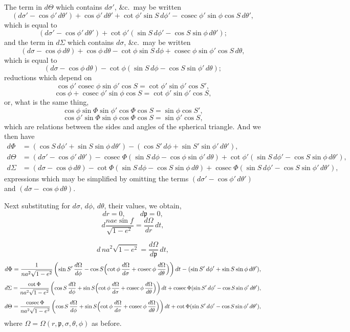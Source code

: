\documentclass[11pt]{article}
\begin{document}
\medskip
\noindent The term in $d\Theta$ which contains $d\sigma'$, \&c.\ may be written
\[
(d\sigma' - \cos\phi'\,d\theta') + \cos\phi'\,d\theta' + \cot\phi'\sin S\,d\phi' - \operatorname{cosec}\phi'\sin\phi\cos S\,d\theta',
\]
which is equal to
\[
(d\sigma' - \cos\phi'\,d\theta') + \cot\phi'(\sin S\,d\phi' - \cos S\sin\phi\,d\theta');
\]
and the term in $d\Sigma$ which contains $d\sigma$, \&c.\ may be written
\[
(d\sigma - \cos\phi\,d\theta) + \cos\phi\,d\theta - \cot\phi\sin S\,d\phi + \operatorname{cosec}\phi\sin\phi'\cos S\,d\theta,
\]
which is equal to
\[
(d\sigma - \cos\phi\,d\theta) - \cot\phi(\sin S\,d\phi - \cos S\sin\phi'\,d\theta);
\]
reductions which depend on
\[
\cos\phi'\operatorname{cosec}\phi\sin\phi'\cos S = \cot\phi'\sin\phi'\cos S',
\]
\[
\cos\phi + \operatorname{cosec}\phi'\sin\phi\cos S = \cot\phi'\sin\phi'\cos S,
\]
or, what is the same thing,
\[
\cos\phi\sin\Phi\sin\phi'\cos\Phi\cos S = \sin\phi\cos S',
\]
\[
\cos\phi'\sin\Phi\sin\phi\cos\Phi\cos S = \sin\phi'\cos S,
\]
which are relations between the sides and angles of the spherical triangle. And we then have
\begin{align*}
d\Phi &= (\cos S\,d\phi' + \sin S\sin\phi\,d\theta') - (\cos S'\,d\phi + \sin S'\sin\phi'\,d\theta'), \\
d\Theta &= (d\sigma' - \cos\phi'\,d\theta') - \operatorname{cosec}\Phi(\sin S\,d\phi - \cos\phi\sin\phi'\,d\theta) + \cot\phi'(\sin S\,d\phi' - \cos S\sin\phi\,d\theta'), \\
d\Sigma &= (d\sigma - \cos\phi\,d\theta) - \cot\Phi(\sin S\,d\phi - \cos S\sin\phi\,d\theta) + \operatorname{cosec}\Phi(\sin S\,d\phi' - \cos S\sin\phi'\,d\theta'),
\end{align*}
expressions which may be simplified by omitting the terms $(d\sigma' - \cos\phi'\,d\theta')$ and $(d\sigma - \cos\phi\,d\theta)$.

\medskip
\noindent Next substituting for $d\sigma$, $d\phi$, $d\theta$, their values, we obtain,
\[
dr = 0,\qquad d\mathfrak{p}=0,
\]
\[
d\frac{nae\sin f}{\sqrt{1-e^{2}}} = \frac{d\Omega}{dr}\,dt,
\]

\bigskip
{}
\[
d\,na^{2}\sqrt{1-e^{2}} = \frac{d\Omega}{d\mathfrak{p}}\,dt,
\]
\[
d\Phi = \frac{1}{na^{2}\sqrt{1-e^{2}}}\left(\sin S'\,\frac{d\Omega}{d\phi} - \cos S\Bigl(\cot\phi\,\frac{d\Omega}{d\sigma} + \operatorname{cosec}\phi\,\frac{d\Omega}{d\theta}\Bigr)\right)dt - (\sin S'\,d\phi' + \sin S\sin\phi\,d\theta'),
\]
\[
d\Sigma = \frac{\cot\Phi}{na^{2}\sqrt{1-e^{2}}}\left(\cos S\,\frac{d\Omega}{d\phi} + \sin S\Bigl(\cot\phi\,\frac{d\Omega}{d\sigma} + \operatorname{cosec}\phi\,\frac{d\Omega}{d\theta}\Bigr)\right)dt + \operatorname{cosec}\Phi(\sin S'\,d\phi' - \cos S\sin\phi'\,d\theta'),
\]
\[
d\Theta = \frac{\operatorname{cosec}\Phi}{na^{2}\sqrt{1-e^{2}}}\left(\cos S\,\frac{d\Omega}{d\phi} + \sin S\Bigl(\cot\phi\,\frac{d\Omega}{d\sigma} + \operatorname{cosec}\phi\,\frac{d\Omega}{d\theta}\Bigr)\right)dt + \cot\Phi(\sin S'\,d\phi' - \cos S\sin\phi'\,d\theta'),
\]
where $\Omega = \Omega(r,\mathfrak{p},\sigma,\theta,\phi)$ as before.
\end{document}
